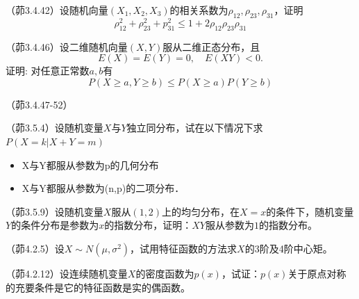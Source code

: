 \begin{problemset}[错题记录]
    \item （茆3.4.42）设随机向量$(X_1,X_2,X_3)$的相关系数为$\rho_{12},\rho_{23},\rho_{31}$，证明
    \[ \rho_{12}^{2}+\rho_{23}^{2}+p_{31}^{2} \le 1+2 \rho_{12} \rho_{23} \rho_{31} \]
    \item （茆3.4.46）设二维随机向量$(X,Y)$服从二维正态分布，且
    \[ E(X)=E(Y)=0, \quad E(X Y)<0. \]
    证明: 对任意正常数$a,b$有
    \[ P(X \ge a, Y \ge b) \le P(X \ge a) P(Y \ge b) \]
    \item （茆3.4.47-52）
    \item （茆3.5.4）设随机变量$X$与$Y$独立同分布，试在以下情况下求$P(X=k|X+Y=m)$
    \begin{itemize}
        \item X与Y都服从参数为p的几何分布
        \item X与Y都服从参数为(n,p)的二项分布．
    \end{itemize}
    \item （茆3.5.9）设随机变量$X$服从$(1,2)$上的均匀分布，在$X=x$的条件下，随机变量$Y$的条件分布是参数为$x$的指数分布，证明：$XY$服从参数为$1$的指数分布。
    \item （茆4.2.5）设$X \sim N ( \mu, \sigma^2 )$，试用特征函数的方法求$X$的3阶及4阶中心矩。
    \item （茆4.2.12）设连续随机变量$X$的密度函数为$p(x)$，试证：$p (x)$关于原点对称的充要条件是它的特征函数是实的偶函数。
\end{problemset}
